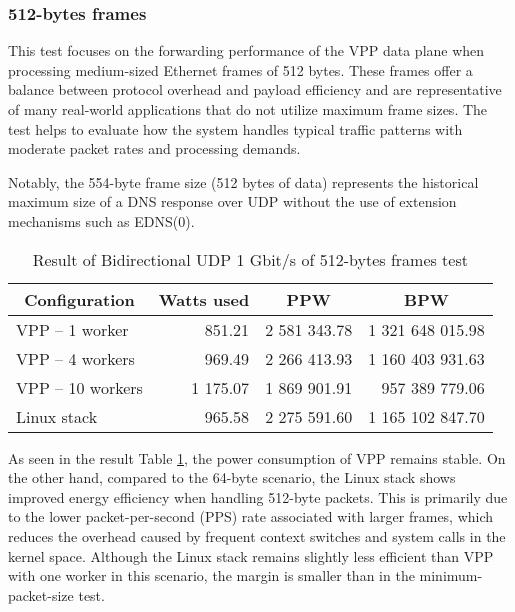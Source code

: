 \subsubsection{512-bytes frames}
This test focuses on the forwarding performance of the VPP data plane when processing medium-sized Ethernet frames of 512 bytes. 
These frames offer a balance between protocol overhead and payload efficiency and are representative of many real-world applications that do not utilize maximum frame sizes. 
The test helps to evaluate how the system handles typical traffic patterns with moderate packet rates and processing demands.

Notably, the 554-byte frame size (512 bytes of data) represents the historical maximum size of a DNS response over UDP without the use of extension mechanisms such as EDNS(0).\cite{satrapa2023dns} 

\begin{table}[h!]
\centering
\begin{tabular}{|l|r|r|r|}
\hline
\multicolumn{1}{|c|}{\textbf{Configuration}} &
\multicolumn{1}{c|}{\textbf{Watts used}} &
\multicolumn{1}{c|}{\textbf{PPW}} &
\multicolumn{1}{c|}{\textbf{BPW}} \\
\hline
VPP -- 1 worker & 851.21 & 2 581 343.78 & 1 321 648 015.98 \\
VPP -- 4 workers & 969.49 & 2 266 413.93 & 1 160 403 931.63 \\
VPP -- 10 workers & 1 175.07 & 1 869 901.91 & 957 389 779.06 \\
Linux stack & 965.58 & 2 275 591.60 & 1 165 102 847.70 \\
\hline
\end{tabular}
\caption{Result of Bidirectional UDP 1 Gbit/s of 512-bytes frames test}
\label{tab:udp:two}
\end{table}

As seen in the result Table \ref{tab:udp:two}, the power consumption of VPP remains stable. 
On the other hand, compared to the 64-byte scenario, the Linux stack shows improved energy efficiency when handling 512-byte packets. 
This is primarily due to the lower packet-per-second (PPS) rate associated with larger frames, which reduces the overhead caused by frequent context switches and system calls in the kernel space. 
Although the Linux stack remains slightly less efficient than VPP with one worker in this scenario, the margin is smaller than in the minimum-packet-size test.

